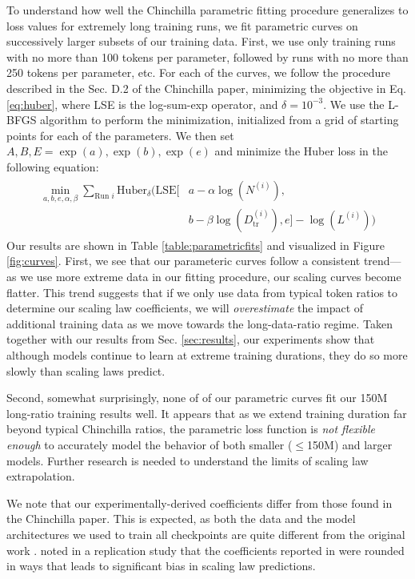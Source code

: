 \documentclass{article}
\theoremstyle{plain}
\theoremstyle{definition}
\theoremstyle{remark}
\newcommand{\Dtr}{D_{\text{tr}}}
\begin{document}
To understand how well the Chinchilla parametric fitting procedure generalizes to loss values for extremely long training runs, we fit parametric curves on successively larger subsets of our training data. First, we use only training runs with no more than 100 tokens per parameter, followed by runs with no more than 250 tokens per parameter, etc. For each of the curves, we follow the procedure described in the Sec. D.2 of the Chinchilla paper, minimizing the objective in Eq. \ref{eq:huber}, where LSE is the log-sum-exp operator, and $\delta=10^{-3}$. We use the L-BFGS algorithm to perform the minimization, initialized from a grid of starting points for each of the parameters. We then set $A, B, E = \exp(a), \exp(b), \exp(e)$ and minimize the Huber loss in the following equation:
\begin{align}
\label{eq:huber}
\begin{split}
\min_{a, b, e, \alpha, \beta} \sum_{\text{Run } i} \text{Huber}_{\delta}\Big(\text{LSE}\big[& a - \alpha \log (N^{(i)}),\\ 
& b - \beta \log(\Dtr^{(i)}), e\big] - \log(L^{(i)}) \Big)
\end{split}
\end{align}
Our results are shown in Table \ref{table:parametricfits} and visualized in Figure \ref{fig:curves}. First, we see that our parameteric curves follow a consistent trend---as we use more extreme data in our fitting procedure, our scaling curves become flatter. This trend suggests that if we only use data from typical token ratios to determine our scaling law coefficients, we will \textit{overestimate} the impact of additional training data as we move towards the long-data-ratio regime. Taken together with our results from Sec. \ref{sec:results}, our experiments show that although models continue to learn at extreme training durations, they do so more slowly than scaling laws predict.  

Second, somewhat surprisingly, none of of our parametric curves fit our 150M long-ratio training results well. It appears that as we extend training duration far beyond typical Chinchilla ratios, the parametric loss function is \textit{not flexible enough} to accurately model the behavior of both smaller ($\leq$150M) and larger models. Further research is needed to understand the limits of scaling law extrapolation.

We note that our experimentally-derived coefficients differ from those found in the Chinchilla paper. This is expected, as both the data and the model architectures we used to train all checkpoints are quite different from the original work \cite{chinchilla}. \citet{besiroglu2024chinchilla} noted in a replication study that the coefficients reported in \citet{chinchilla} were rounded in ways that leads to significant bias in scaling law predictions.
\end{document}

